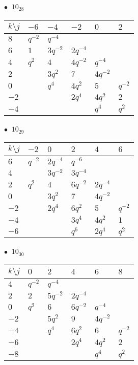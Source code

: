 \begin{minipage}{\linewidth}
$\bullet\ $ $10_{28}$ \vspace{0.5em} \\
\begin{tabular}{l|lllll}
$k \setminus j$ & $-6$ & $-4$ & $-2$ & $0$ & $2$ \\
\hline
$8$ & $q^{-2}$ & $q^{-4}$ &  &  &  \\
$6$ & $1$ & $3q^{-2}$ & $2q^{-4}$ &  &  \\
$4$ & $q^{2}$ & $4$ & $4q^{-2}$ & $q^{-4}$ &  \\
$2$ &  & $3q^{2}$ & $7$ & $4q^{-2}$ &  \\
$0$ &  & $q^{4}$ & $4q^{2}$ & $5$ & $q^{-2}$ \\
$-2$ &  &  & $2q^{4}$ & $4q^{2}$ & $2$ \\
$-4$ &  &  &  & $q^{4}$ & $q^{2}$ \\
\end{tabular}
\vspace{2em}
\end{minipage}
%
\begin{minipage}{\linewidth}
$\bullet\ $ $10_{29}$ \vspace{0.5em} \\
\begin{tabular}{l|lllll}
$k \setminus j$ & $-2$ & $0$ & $2$ & $4$ & $6$ \\
\hline
$6$ & $q^{-2}$ & $2q^{-4}$ & $q^{-6}$ &  &  \\
$4$ &  & $3q^{-2}$ & $3q^{-4}$ &  &  \\
$2$ & $q^{2}$ & $4$ & $6q^{-2}$ & $2q^{-4}$ &  \\
$0$ &  & $3q^{2}$ & $7$ & $4q^{-2}$ &  \\
$-2$ &  & $2q^{4}$ & $6q^{2}$ & $5$ & $q^{-2}$ \\
$-4$ &  &  & $3q^{4}$ & $4q^{2}$ & $1$ \\
$-6$ &  &  & $q^{6}$ & $2q^{4}$ & $q^{2}$ \\
\end{tabular}
\vspace{2em}
\end{minipage}
%
\begin{minipage}{\linewidth}
$\bullet\ $ $10_{30}$ \vspace{0.5em} \\
\begin{tabular}{l|lllll}
$k \setminus j$ & $0$ & $2$ & $4$ & $6$ & $8$ \\
\hline
$4$ & $q^{-2}$ & $q^{-4}$ &  &  &  \\
$2$ & $2$ & $5q^{-2}$ & $2q^{-4}$ &  &  \\
$0$ & $q^{2}$ & $6$ & $6q^{-2}$ & $q^{-4}$ &  \\
$-2$ &  & $5q^{2}$ & $9$ & $4q^{-2}$ &  \\
$-4$ &  & $q^{4}$ & $6q^{2}$ & $6$ & $q^{-2}$ \\
$-6$ &  &  & $2q^{4}$ & $4q^{2}$ & $2$ \\
$-8$ &  &  &  & $q^{4}$ & $q^{2}$ \\
\end{tabular}
\vspace{2em}
\end{minipage}
